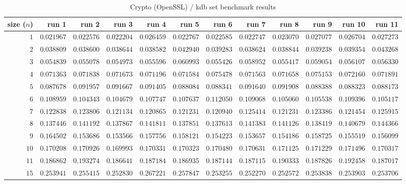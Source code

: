  
\begin{sidewaystable} \centering \caption{Crypto (OpenSSL) / kdb set benchmark results} \label{eval-table-openssl-set} \scriptsize \begin{tabular}{r|rrrrrrrrrrr} size ($n$) & run 1 & run 2 & run 3 & run 4 & run 5 & run 6 & run 7 & run 8 & run 9 & run 10 & run 11\\ \hline
$1$ & $0.021967$ & $0.022576$ & $0.022204$ & $0.026459$ & $0.022767$ & $0.022585$ & $0.022747$ & $0.023070$ & $0.027077$ & $0.026704$ & $0.027273$ \\
$2$ & $0.038809$ & $0.038600$ & $0.038644$ & $0.038582$ & $0.042940$ & $0.039283$ & $0.038624$ & $0.038844$ & $0.039238$ & $0.039354$ & $0.043268$ \\
$3$ & $0.054839$ & $0.055078$ & $0.054973$ & $0.055596$ & $0.060993$ & $0.055426$ & $0.058952$ & $0.055417$ & $0.059054$ & $0.056107$ & $0.056330$ \\
$4$ & $0.071363$ & $0.071838$ & $0.071673$ & $0.071196$ & $0.071584$ & $0.075478$ & $0.071563$ & $0.071658$ & $0.075153$ & $0.072160$ & $0.071891$ \\
$5$ & $0.087678$ & $0.091957$ & $0.091667$ & $0.091405$ & $0.088084$ & $0.088341$ & $0.091640$ & $0.091908$ & $0.088388$ & $0.088323$ & $0.088173$ \\
$6$ & $0.108959$ & $0.104343$ & $0.104679$ & $0.107747$ & $0.107637$ & $0.112050$ & $0.109068$ & $0.105060$ & $0.105538$ & $0.109396$ & $0.105117$ \\
$7$ & $0.122838$ & $0.123806$ & $0.121134$ & $0.120865$ & $0.121231$ & $0.120940$ & $0.125414$ & $0.121231$ & $0.123386$ & $0.121454$ & $0.125915$ \\
$8$ & $0.137446$ & $0.141192$ & $0.137867$ & $0.141811$ & $0.137851$ & $0.137613$ & $0.141383$ & $0.141126$ & $0.138419$ & $0.140679$ & $0.144366$ \\
$9$ & $0.164502$ & $0.153686$ & $0.153566$ & $0.157756$ & $0.158121$ & $0.154223$ & $0.153657$ & $0.154186$ & $0.158725$ & $0.155519$ & $0.156099$ \\
$10$ & $0.170208$ & $0.170926$ & $0.169993$ & $0.170331$ & $0.170323$ & $0.170480$ & $0.170631$ & $0.171125$ & $0.171229$ & $0.171496$ & $0.170317$ \\
$11$ & $0.186862$ & $0.193274$ & $0.186641$ & $0.187184$ & $0.186935$ & $0.187144$ & $0.187115$ & $0.190333$ & $0.187826$ & $0.192458$ & $0.187017$ \\
$15$ & $0.253941$ & $0.255415$ & $0.252830$ & $0.267221$ & $0.257847$ & $0.253255$ & $0.252270$ & $0.252572$ & $0.253838$ & $0.253903$ & $0.253706$ \\

\end{tabular}
\end{sidewaystable}
